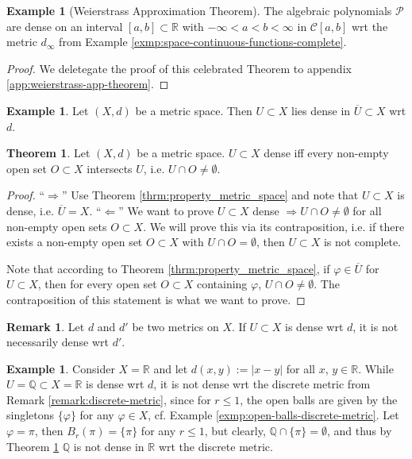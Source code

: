 \documentclass[12pt, a4paper]{article}
\numberwithin{equation}{section}
\theoremstyle{definition}
\theoremstyle{definition}
\newtheorem{exmp}[thm]{Example} %
\newtheorem{remark}[thm]{Remark} %
\newtheorem{theorem}[thm]{Theorem}
\newcommand{\abs}[1]{\left\vert #1 \right\vert}
\begin{document}
	\begin{exmp}[Weierstrass Approximation Theorem]\label{exmp:weierstrass-approx-thrm}
		The algebraic polynomials $\mathcal P$ are dense on an interval $[a, b]\subset \mathbb R$ with $-\infty < a < b < \infty$ in $\mathcal C[a, b]$ wrt the metric $d_{\infty}$ from Example \ref{exmp:space-continuous-functions-complete}. \cite[Corollary 6.12]{iske:approximation}
	\end{exmp}

	\begin{proof}
		We deletegate the proof of this celebrated Theorem to appendix \ref{app:weierstrass-app-theorem}. 
	\end{proof}

	\begin{exmp}
		Let $(X, d)$ be a metric space. Then $U\subset X$ lies dense in $\overline{U}\subset X$ wrt $d$.
	\end{exmp}

	\begin{theorem}\label{thrm:characterization-dense-subsets}
		Let $(X, d)$ be a metric space. $U\subset X$ dense iff every non-empty open set $O\subset X$ intersects $U$, i.e. $U\cap O\ne\emptyset$.
	\end{theorem}

	\begin{proof}
		\enquote{$\Longrightarrow$} Use Theorem \ref{thrm:property_metric_space} and note that $U\subset X$ is dense, i.e. $\overline{U} = X$.
		\newline\newline\enquote{$\Longleftarrow$} We want to prove $U\subset X$ dense $\Rightarrow U\cap O\ne\emptyset$ for all non-empty open sets $O\subset X$. We will prove this via its contraposition, i.e. if there exists a non-empty open set $O\subset X$ with $U\cap O=\emptyset$, then $U\subset X$ is not complete.
		
		Note that according to Theorem \ref{thrm:property_metric_space}, if $\varphi\in\overline{U}$ for $U\subset X$, then for every open set $O\subset X$ containing $\varphi$, $U\cap O\ne\emptyset$. The contraposition of this statement is what we want to prove.
	\end{proof}

	\begin{remark}
		Let $d$ and $d'$ be two metrics on $X$. If $U\subset X$ is dense wrt $d$, it is not necessarily dense wrt $d'$.
	\end{remark}

	\begin{exmp}
		Consider $X=\mathbb R$ and let $d(x, y) := \abs{x - y}$ for all $x$, $y\in\mathbb R$. While $U = \mathbb Q \subset X = \mathbb R$ is dense wrt $d$, it is not dense wrt the discrete metric from Remark \ref{remark:discrete-metric}, since for $r \leq 1$, the open balls are given by the singletons $\{\varphi\}$ for any $\varphi\in X$, cf. Example \ref{exmp:open-balls-discrete-metric}. Let $\varphi = \pi$, then $B_{r}(\pi) = \{\pi\}$ for any $r\leq 1$, but clearly, $\mathbb Q \cap \{\pi\} = \emptyset$, and thus by Theorem \ref{thrm:characterization-dense-subsets} $\mathbb Q$ is not dense in $\mathbb R$ wrt the discrete metric.
	\end{exmp}
\end{document}
